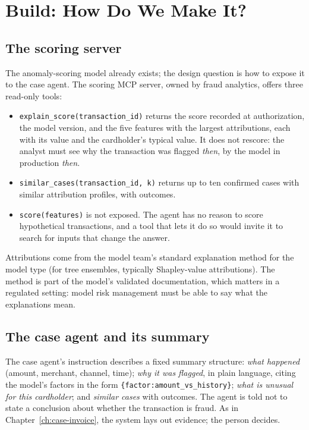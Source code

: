 
\section{Build: How Do We Make It?}
\label{sec:fr-build}

\subsection{The scoring server}

The anomaly-scoring model already exists; the design question is how to expose it to the case agent. The scoring MCP server, owned by fraud analytics, offers three read-only tools:
\begin{itemize}[itemsep=1pt]
  \item \texttt{explain\_score(transaction\_id)} returns the score recorded at authorization, the model version, and the five features with the largest attributions, each with its value and the cardholder's typical value. It does not rescore: the analyst must see why the transaction was flagged \emph{then}, by the model in production \emph{then}.
  \item \texttt{similar\_cases(transaction\_id, k)} returns up to ten confirmed cases with similar attribution profiles, with outcomes.
  \item \texttt{score(features)} is not exposed. The agent has no reason to score hypothetical transactions, and a tool that lets it do so would invite it to search for inputs that change the answer.
\end{itemize}
Attributions come from the model team's standard explanation method for the model type (for tree ensembles, typically Shapley-value attributions). The method is part of the model's validated documentation, which matters in a regulated setting: model risk management must be able to say what the explanations mean.

\subsection{The case agent and its summary}

The case agent's instruction describes a fixed summary structure: \emph{what happened} (amount, merchant, channel, time); \emph{why it was flagged}, in plain language, citing the model's factors in the form \texttt{\{factor:amount\_vs\_history\}}; \emph{what is unusual for this cardholder}; and \emph{similar cases} with outcomes. The agent is told not to state a conclusion about whether the transaction is fraud. As in Chapter~\ref{ch:case-invoice}, the system lays out evidence; the person decides.

